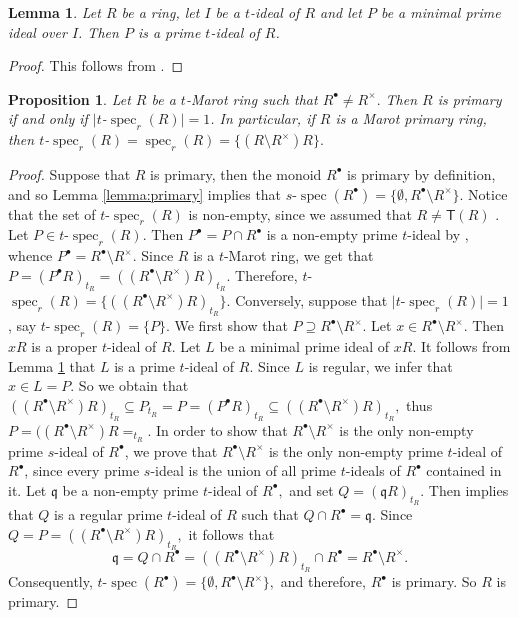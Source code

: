 \documentclass[a4paper, 10pt]{amsart}
\theoremstyle{plain}
\newtheorem{proposition}[theorem]{Proposition}
\newtheorem{lemma}[theorem]{Lemma}
\theoremstyle{definition}
\theoremstyle{remark}
\DeclareMathOperator{\spec}{spec}
\numberwithin{equation}{section}
\begin{document}
\begin{lemma}\label{lemma:HK}
    Let $R$ be a ring, let $I$ be a $t$-ideal of $R$ and let $P$ be a minimal prime ideal over $I$. Then $P$ is a prime $t$-ideal of $R$.
\end{lemma}
\begin{proof}
    This follows from \cite[Proposition 6.6]{HK98}.
\end{proof}
\begin{proposition}\label{lemma:stronglyprimary}
    Let $R$ be a $t$-Marot ring such that $R^\bullet\ne R^\times.$
  Then $R$ is primary if and only if $|t$-$\spec_r( R)|=1$. In particular, if $R$ is a Marot primary ring, then  $t$-$\spec_r(R)=\spec_r(R)=\{(R\setminus R^\times)R\}.$
\end{proposition}
\begin{proof}
      Suppose that $R$ is primary, then the monoid $R^\bullet$ is primary by definition, and so Lemma \ref{lemma:primary} implies that $s$-$\spec(R^\bullet)=\{\emptyset, R^\bullet\setminus R^\times\}$. Notice that the set of $t$-$\spec_r(R)$ is non-empty, since we assumed that $R\ne \mathsf{T}(R)$ \cite[Lemma 3.2.8(2)]{El19}. Let $P\in t$-$\spec_r(R).$ Then  $P^\bullet=P\cap R^\bullet$ is a non-empty prime $t$-ideal by \cite[Theorem 2.7]{CO22}, whence $P^\bullet=R^\bullet\setminus R^\times.$ Since $R$ is a $t$-Marot ring, we get that $P=(P^\bullet R)_{t_R}=((R^\bullet\setminus R^\times)R)_{t_R}.$ Therefore, $t$-$\spec_r(R)=\{((R^\bullet\setminus R^\times)R)_{t_R}\}.$  Conversely, suppose that $|t$-$\spec_r(R)|=1$, say $t$-$\spec_r(R)=\{P\}.$ We first show that $P\supseteq R^\bullet\setminus R^\times$. Let $x\in R^\bullet \setminus R^\times$. Then $xR$ is a proper $t$-ideal of $R$. Let $L$ be a minimal prime ideal of $xR$. It follows from Lemma \ref{lemma:HK} that $L$ is a prime $t$-ideal of $R$. Since $L$ is regular, we infer that $x\in L=P$. So we obtain that $((R^\bullet\setminus R^\times)R)_{t_R}\subseteq P_{t_R}=P=(P^\bullet R)_{t_R}\subseteq ((R^\bullet\setminus R^\times)R)_{t_R},$ thus $P=((R^\bullet\setminus R^\times)R=_{t_R}$. In order to show that $R^\bullet\setminus R^\times$ is the only non-empty prime $s$-ideal of $R^\bullet$, we prove that $R^\bullet\setminus R^\times$ is the only non-empty prime $t$-ideal of $R^\bullet$, since every prime $s$-ideal is the union of all prime $t$-ideals of $R^\bullet$ contained in it. Let $\mathfrak{q}$ be a non-empty prime $t$-ideal of $R^\bullet,$ and set $Q=(\mathfrak{q}R)_{t_R}.$ Then \cite[Theorem 2.7]{CO22} implies that $Q$ is a regular prime $t$-ideal of $R$ such that $Q\cap R^\bullet=\mathfrak{q}$. Since $Q=P=((R^\bullet\setminus R^\times)R)_{t_R},$ it follows that \[\mathfrak{q}=Q\cap R^\bullet = ((R^\bullet\setminus R^\times)R)_{t_R} \cap R^\bullet = R^\bullet \setminus R^\times.\] Consequently, $t$-$\spec(R^\bullet)=\{\emptyset, R^\bullet\setminus R^\times\},$ and therefore, $R^\bullet$ is primary. So $R$ is primary. 
      

\end{proof}
\end{document}
